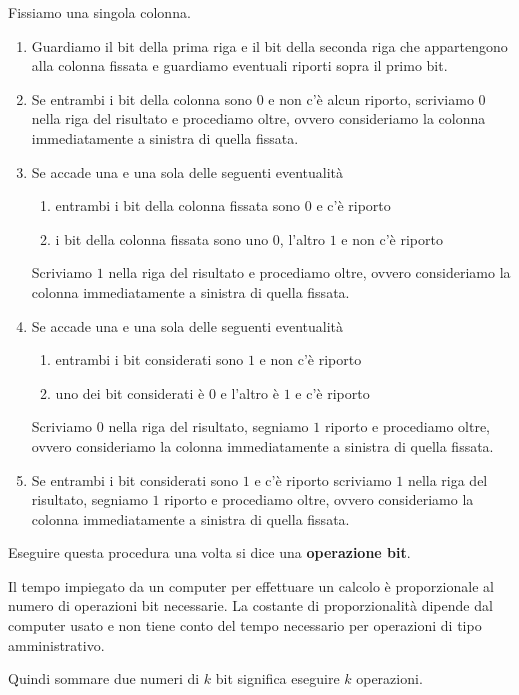 \documentclass[a4paper,12pt, oneside]{book}
\begin{document}
\begin{algoritmo}
	Fissiamo una singola colonna.
	\begin{enumerate}
		\item Guardiamo il bit della prima riga e il bit della seconda riga che appartengono alla colonna fissata e guardiamo eventuali riporti sopra il primo bit.
		\item Se entrambi i bit della colonna sono $0$ e non c'è alcun riporto, scriviamo $0$ nella riga del risultato e procediamo oltre, ovvero consideriamo la colonna immediatamente a sinistra di quella fissata.
		\item Se accade una e una sola delle seguenti eventualità
		      \begin{enumerate}
			      \item entrambi i bit della colonna fissata sono $0$ e c'è riporto
			      \item i bit della colonna fissata sono uno $0$, l'altro $1$ e non c'è riporto
		      \end{enumerate}
		      Scriviamo $1$ nella riga del risultato e procediamo oltre, ovvero consideriamo la colonna immediatamente a sinistra di quella fissata.
		\item Se accade una e una sola delle seguenti eventualità
		      \begin{enumerate}
			      \item entrambi i bit considerati sono $1$ e non c'è riporto
			      \item uno dei bit considerati è $0$ e l'altro è $1$ e c'è riporto
		      \end{enumerate}
		      Scriviamo $0$ nella riga del risultato, segniamo $1$ riporto e procediamo oltre, ovvero consideriamo la colonna immediatamente a sinistra di quella fissata.
		\item Se entrambi i bit considerati sono $1$ e c'è riporto scriviamo $1$ nella riga del risultato, segniamo $1$ riporto e procediamo oltre, ovvero consideriamo la colonna immediatamente a sinistra di quella fissata.
	\end{enumerate}
\end{algoritmo}
Eseguire questa procedura una volta si dice una \textbf{operazione bit}.
\begin{nota}
	Il tempo impiegato da un computer per effettuare un calcolo è proporzionale al numero di operazioni bit necessarie. La costante di proporzionalità dipende dal computer usato e non tiene conto del tempo necessario per operazioni di tipo amministrativo.
\end{nota}
Quindi sommare due numeri di $k$ bit significa eseguire $k$ operazioni.
\end{document}
